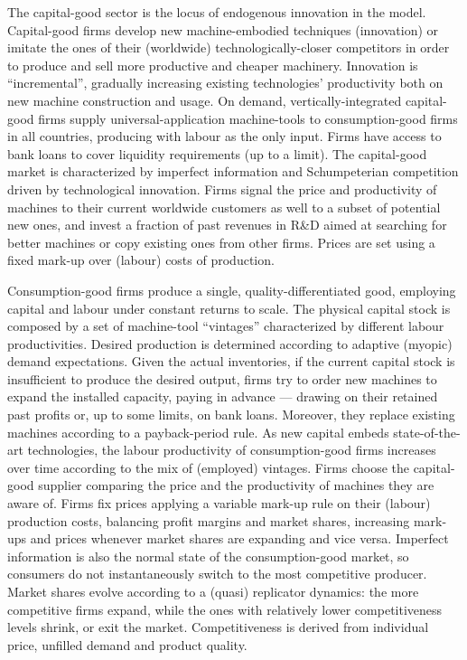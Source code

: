 \documentclass[a4paper,11pt]{article}
\begin{document}
The capital-good sector is the locus of endogenous innovation in the model. Capital-good firms develop new machine-embodied techniques (innovation) or imitate the ones of their (worldwide) technologically-closer competitors in order to produce and sell more productive and cheaper machinery. Innovation is ``incremental'', gradually increasing existing technologies' productivity both on new machine construction and usage. On demand, vertically-integrated capital-good firms supply universal-application machine-tools to consumption-good firms in all countries, producing with labour as the only input. Firms have access to bank loans to cover liquidity requirements (up to a limit). The capital-good market is characterized by imperfect information and Schumpeterian competition driven by technological innovation. Firms signal the price and productivity of machines to their current worldwide customers as well to a subset of potential new ones, and invest a fraction of past revenues in R\&D aimed at searching for better machines or copy existing ones from other firms. Prices are set using a fixed mark-up over (labour) costs of production.

Consumption-good firms produce a single, quality-differentiated good, employing capital and labour under constant returns to scale. The physical capital stock is composed by a set of machine-tool ``vintages'' characterized by different labour productivities. Desired production is determined according to adaptive (myopic) demand expectations. Given the actual inventories, if the current capital stock is insufficient to produce the desired output, firms try to order new machines to expand the installed capacity, paying in advance — drawing on their retained past profits or, up to some limits, on bank loans. Moreover, they replace existing machines according to a payback-period rule. As new capital embeds state-of-the-art technologies, the labour productivity of consumption-good firms increases over time according to the mix of (employed) vintages. Firms choose the capital-good supplier comparing the price and the productivity of machines they are aware of. Firms fix prices applying a variable mark-up rule on their (labour) production costs, balancing profit margins and market shares, increasing mark-ups and prices whenever market shares are expanding and vice versa. Imperfect information is also the normal state of the consumption-good market, so consumers do not instantaneously switch to the most competitive producer. Market shares evolve according to a (quasi) replicator dynamics: the more competitive firms expand, while the ones with relatively lower competitiveness levels shrink, or exit the market. Competitiveness is derived from individual price, unfilled demand and product quality.
\end{document}
